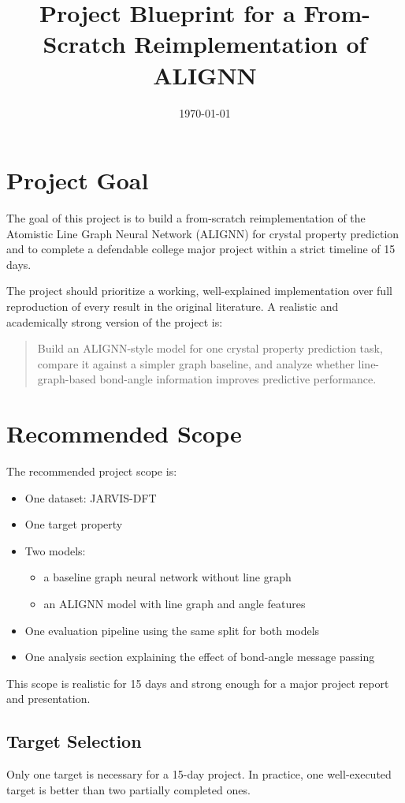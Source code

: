 \documentclass[12pt]{article}
\title{Project Blueprint for a From-Scratch Reimplementation of ALIGNN}
\author{}
\date{\today}
\begin{document}
\maketitle

\section{Project Goal}
The goal of this project is to build a from-scratch reimplementation of the Atomistic Line Graph Neural Network (ALIGNN) for crystal property prediction and to complete a defendable college major project within a strict timeline of 15 days.

The project should prioritize a working, well-explained implementation over full reproduction of every result in the original literature. A realistic and academically strong version of the project is:

\begin{quote}
Build an ALIGNN-style model for one crystal property prediction task, compare it against a simpler graph baseline, and analyze whether line-graph-based bond-angle information improves predictive performance.
\end{quote}

\section{Recommended Scope}
The recommended project scope is:

\begin{itemize}
    \item One dataset: JARVIS-DFT
    \item One target property
    \item Two models:
    \begin{itemize}
        \item a baseline graph neural network without line graph
        \item an ALIGNN model with line graph and angle features
    \end{itemize}
    \item One evaluation pipeline using the same split for both models
    \item One analysis section explaining the effect of bond-angle message passing
\end{itemize}

This scope is realistic for 15 days and strong enough for a major project report and presentation.

\subsection{Target Selection}
Only one target is necessary for a 15-day project. In practice, one well-executed target is better than two partially completed ones.
\end{document}
